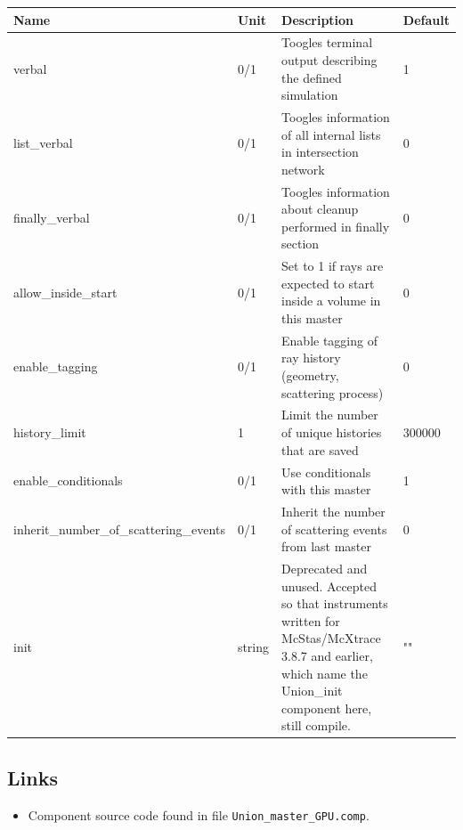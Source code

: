 \begin{longtable}{p{}p{}p{}p{}}
\toprule
\textbf{Name} & \textbf{Unit} & \textbf{Description} & \textbf{Default} \\
\midrule
\endhead
verbal & 0/1 & Toogles terminal output describing the defined simulation & 1 \\
list\_verbal & 0/1 & Toogles information of all internal lists in intersection network & 0 \\
finally\_verbal & 0/1 & Toogles information about cleanup performed in finally section & 0 \\
allow\_inside\_start & 0/1 & Set to 1 if rays are expected to start inside a volume in this master & 0 \\
enable\_tagging & 0/1 & Enable tagging of ray history (geometry, scattering process) & 0 \\
history\_limit & 1 & Limit the number of unique histories that are saved & 300000 \\
enable\_conditionals & 0/1 & Use conditionals with this master & 1 \\
inherit\_number\_of\_scattering\_events & 0/1 & Inherit the number of scattering events from last master & 0 \\
init & string & Deprecated and unused. Accepted so that instruments written for McStas/McXtrace 3.8.7 and earlier, which name the Union\_init component here, still compile. & "" \\
\bottomrule
\end{longtable}

\subsection*{Links}
\begin{itemize}
  \item Component source code found in file \texttt{Union\_master\_GPU.comp}.
\end{itemize}
